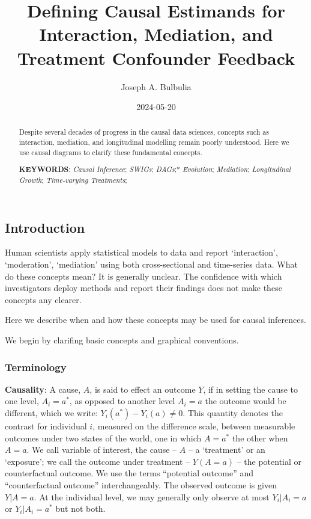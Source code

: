 \documentclass[
  single column]{article}
\title{Defining Causal Estimands for Interaction, Mediation, and
Treatment Confounder Feedback}
\author{Joseph A. Bulbulia}
\affil{%
             \small{     Victoria University of Wellington, New Zealand
          ORCID \textcolor[HTML]{A6CE39}{\aiOrcid} ~0000-0002-5861-2056 }
              }
\date{2024-05-20}
\begin{document}
\maketitle
\begin{abstract}
Despite several decades of progress in the causal data sciences,
concepts such as interaction, mediation, and longitudinal modelling
remain poorly understood. Here we use causal diagrams to clarify these
fundamental concepts.

\textbf{KEYWORDS}: \emph{Causal Inference}; \emph{SWIGs}; \emph{DAGs};*
\emph{Evolution}; \emph{Mediation}; \emph{Longitudinal Growth};
\emph{Time-varying Treatments};
\end{abstract}

\subsection{Introduction}\label{introduction}

Human scientists apply statistical models to data and report
`interaction', `moderation', `mediation' using both cross-sectional and
time-series data. What do these concepts mean? It is generally unclear.
The confidence with which investigators deploy methods and report their
findings does not make these concepts any clearer.

Here we describe when and how these concepts may be used for causal
inferences.

We begin by clarifing basic concepts and graphical conventions.

\subsubsection{Terminology}\label{terminology}

\textbf{Causality}: A cause, \(A\), is said to effect an outcome \(Y\),
if in setting the cause to one level, \(A_i = a^*\), as opposed to
another level \(A_i = a\) the outcome would be different, which we
write: \(Y_i(a^*) -  Y_i(a) \neq 0\). This quantity denotes the contrast
for individual \(i\), measured on the difference scale, between
measurable outcomes under two states of the world, one in which
\(A = a^*\) the other when \(A=a\). We call variable of interest, the
cause -- \(A\) -- a `treatment' or an `exposure'; we call the outcome
under treatment -- \(Y(A = a)\) -- the potential or counterfactual
outcome. We use the terms ``potential outcome'' and ``counterfactual
outcome'' interchangeably. The observed outcome is given \(Y|A=a\). At
the individual level, we may generally only observe at most
\(Y_i|A_i =a\) or \(Y_i|A_i =a^*\) but not both.
\end{document}
